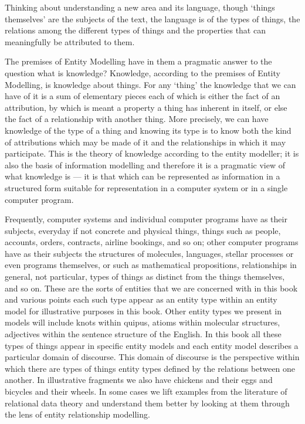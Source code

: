 Thinking about understanding a new area and its language, though ‘things themselves’ are the subjects of the text, the language is of the types of things, the relations among the different types of things and the properties that can meaningfully be attributed to them. 

The premises of Entity Modelling have in them a pragmatic answer to the question what is knowledge? Knowledge, according to the premises of Entity Modelling, is knowledge about things. For any ‘thing’ the knowledge that we can have of it is a sum of elementary pieces each of which is either the fact of an attribution, by which is meant a property a thing has inherent in itself, or else the fact of a relationship with another thing. More precisely, we can have knowledge of the type of a thing and knowing its type is to know both the kind of attributions which may be made of it and the relationships in which it may participate. This is the theory of knowledge according to the entity modeller; it is also the basis of information modelling and therefore it is a pragmatic view of what knowledge is — it is that which can be represented as information in a structured form suitable for representation in a computer system or in a single computer program.

Frequently, computer systems and individual computer programs have as their subjects, everyday if not concrete and physical things, things such as people, accounts, orders, contracts, airline bookings, and so on; other computer programs have as their subjects the structures of molecules, languages, stellar processes or even programs themselves, or such as mathematical propositions, relationships in general, not particular, types of things as distinct from the things themselves, and so on. These are the sorts of entities that we are concerned with in this book and various points each such type appear as an entity type within an entity model for illustrative purposes in this book. Other entity types we present in models will include knots within quipus, atioms within molecular structures, adjectives within the sentence structure of the English. In this book all these types of things appear in specific entity models and each entity model describes a particular domain of discourse. This domain of discourse is the perspective within which there are types of things entity types defined by the relations between one another. In illustrative fragments we also have chickens and their eggs and bicycles and their wheels. In some cases we lift examples from the literature of relational data theory and understand them better by looking at them through the lens of entity relationship modelling.



